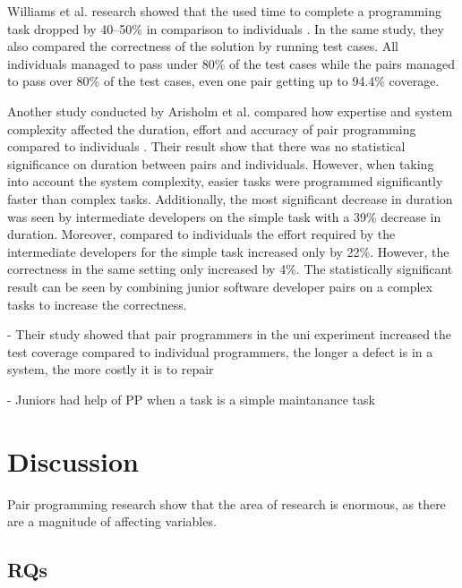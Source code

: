 \documentclass[conference]{IEEEtran}
\begin{document}
Williams et al. research showed that the used time to complete a programming task dropped by 40--50\% in comparison to individuals \cite{Williams2000Strengthening}. In the same study, they also compared the correctness of the solution by running test cases. All individuals managed to pass under 80\% of the test cases while the pairs managed to pass over 80\% of the test cases, even one pair getting up to 94.4\% coverage. 

Another study conducted by Arisholm et al. compared how expertise and system complexity affected the duration, effort and accuracy of pair programming compared to individuals \cite{Arisholm2007Evaluating}. Their result show that there was no statistical significance on duration between pairs and individuals. However, when taking into account the system complexity, easier tasks were programmed significantly faster than complex tasks. Additionally, the most significant decrease in duration was seen by intermediate developers on the simple task with a 39\% decrease in duration. Moreover, compared to individuals the effort required by the intermediate developers for the simple task increased only by 22\%. However, the correctness in the same setting only increased by 4\%. The statistically significant result can be seen by combining junior software developer pairs on a complex tasks to increase the correctness.

- Their study showed that pair programmers in the uni experiment increased the test coverage compared to individual programmers, the longer a defect is in a system, the more costly it is to repair \cite{Williams2000Strengthening}



- Juniors had help of PP when a task is a simple maintanance task \cite{Arisholm2007Evaluating}



\section{Discussion}

Pair programming research show that the area of research is enormous, as there are a magnitude of affecting variables.


\subsection{RQs}
\end{document}
